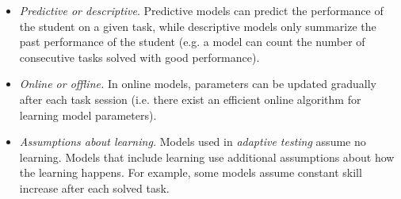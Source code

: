 \begin{itemize}
\item \emph{Predictive or descriptive}.
Predictive models can predict the performance of the student on a given task,
while descriptive models only summarize the past performance of the student
(e.g. a model can count the number of consecutive tasks solved with good performance).
\item \emph{Online or offline.}
In online models, parameters can be updated gradually after each task session
(i.e. there exist an efficient online algorithm for learning model parameters).
\item \emph{Assumptions about learning.}
Models used in \emph{adaptive testing} \cite{cat} assume no learning.
Models that include learning use additional assumptions
about how the learning happens. %
For example, some models assume constant skill increase after each solved task.
\end{itemize}


